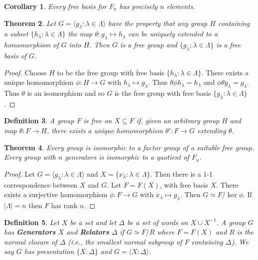 \documentclass[a4paper,10pt]{article}
\newtheorem{thm}{Theorem}
\newtheorem{Def}[thm]{Definition}
\newtheorem{Cor}[thm]{Corollary}
\begin{document}
\begin{Cor}
Every free basis for $F_n$ has precisely $n$ elements. 
\end{Cor}


\begin{thm}
Let $G = \langle g_\lambda : \lambda \in \Lambda \rangle$ have the property that any group $H$ containing a subset $\{h_\lambda : \lambda \in \Lambda \}$ the map $\theta : g_\lambda \mapsto h_\lambda$ can be uniquely extended to a homomorphism of $G$ into $H$. Then $G$ is a free group and $\{g_\lambda ; \lambda \in \Lambda\}$ is a free basis of $G$. 
\end{thm}
\begin{proof}
Choose $H$ to be the free group with free basis $\{ h_\lambda : \lambda \in \Lambda\}$. There exists a unique homomorphism $\phi : H \rightarrow G$ with $h_\lambda \mapsto g_\lambda$. Thus $\theta\phi h_\lambda = h_\lambda$ and $\phi \theta g_\lambda = g_\lambda$. Thus $\theta$ is an isomorphism and so $G$ is the free group with free basis $\{ g_\lambda : \lambda \in \Lambda \}$.
\end{proof}

\begin{Def}
A group $F$ is free on $X \subseteq F$ if, given an arbitrary group $H$ and map $\theta: F \rightarrow H$, there exists a unique homomorphism $\theta' : F \rightarrow G$ extending $\theta$. 
\end{Def}

\begin{thm}
Every group is isomorphic to a factor group of a suitable free group. Every group with $n$ generators is isomorphic to a quotient of $F_n$. 
\end{thm}
\begin{proof}
Let $G = \langle g_\lambda : \lambda \in \Lambda\rangle$ and $X = \{ x_\lambda : \lambda \in \Lambda \}$. Then there is a 1-1 correspondence between $X$ and $G$. Let $F = F(X)$, with free basis $X$. There exists a surjective homomorphism $\phi : F \rightarrow G$ with $x_\lambda \mapsto g_\lambda$. Then $G \simeq F / \ker \phi$. If $|\Lambda| = n$ then $F$ has rank $n$. 
\end{proof}

\begin{Def}
Let $X$ be a set and let $\Delta$ be a set of words on $X \cup X^{-1}$. A group $G$ has \textbf{Generators} $X$ and \textbf{Relators} $\Delta$ if $G \simeq F / R$ where $F = F(X)$ and $R$ is the normal closure of $\Delta$ (i.e., the smallest normal subgroup of $F$ containing $\Delta$). We say $G$ has presentation $\{ X : \Delta \}$ and $G = \langle X : \Delta \rangle$. 
\end{Def}
\end{document}
